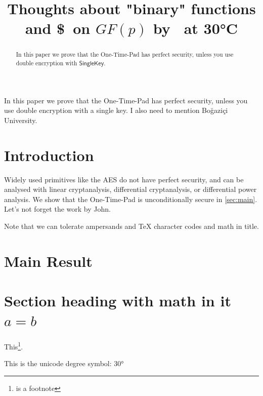 \documentclass{article}
\title[running={Thoughts on binary functions},
  plaintext={Thoughts about "binary" functions and \$\ on $GF(p)$ by Fester Bestertester at 30°C}]{%
  Thoughts about "binary" functions and \$\ on $GF(p)$ by \niceguy\ at 30°C}
\begin{document}
\maketitle

\begin{abstract}
  In this paper we prove that the One-Time-Pad has perfect security, unless you use
  double encryption with {$\mathsf{SingleKey}$}.
\lipsum[8]
\end{abstract}
\begin{textabstract}
  In this paper we prove that the One-Time-Pad has perfect security, unless you use
  double encryption with a single key. I also need to mention
  Bo{\u g}azi{\c c}i University.
\end{textabstract}

\section{Introduction}

Widely used primitives like the AES do not have perfect
security, and can be analysed with linear
cryptanalysis, differential
cryptanalysis, or differential power
analysis.  We show that the One-Time-Pad is
unconditionally secure in \autoref{sec:main}. Let's not forget
the work by John.

Note that we can tolerate ampersands and \TeX
character codes and math in
title.

\lipsum[9]

\section{Main Result}\label{sec:main}

\lipsum

\section{Section heading with math in it $a=b$}
\lipsum

This\footnote{is a footnote}.

This is the unicode degree symbol: 30°
%
\end{document}
